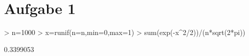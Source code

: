 

\section{Aufgabe 1}

\begin{Schunk}
\begin{Sinput}
> n=1000
> x=runif(n=n,min=0,max=1)
> sum(exp(-x^2/2))/(n*sqrt(2*pi))
\end{Sinput}
\begin{Soutput}
[1] 0.3399053
\end{Soutput}
\end{Schunk}

